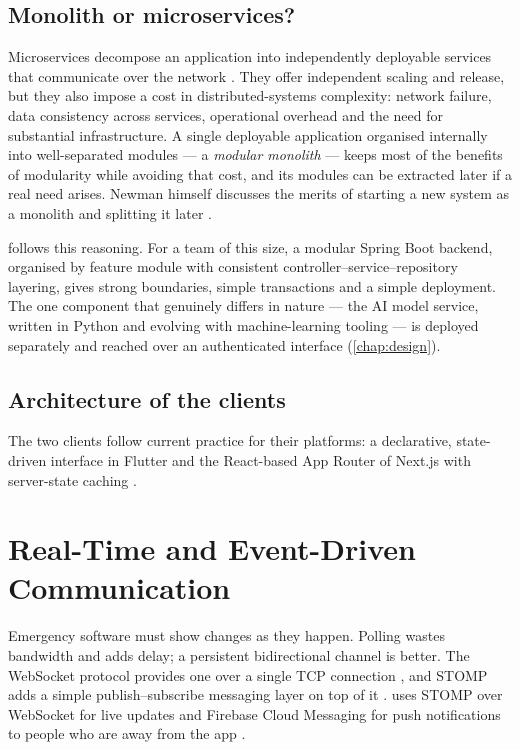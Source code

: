 \subsection{Monolith or microservices?}
Microservices decompose an application into independently deployable services that communicate over the network
\cite{lewis2014microservices,newman2021microservices,richardson2018microservices}. They offer independent
scaling and release, but they also impose a cost in distributed-systems complexity: network failure, data
consistency across services, operational overhead and the need for substantial infrastructure. A single
deployable application organised internally into well-separated modules --- a \emph{modular monolith} --- keeps
most of the benefits of modularity while avoiding that cost, and its modules can be extracted later if a real
need arises. Newman himself discusses the merits of starting a new system as a monolith and splitting it later
\cite{newman2021microservices}.

\ProjectName{} follows this reasoning. For a team of this size, a modular Spring Boot backend, organised by feature
module with consistent controller--service--repository layering, gives strong boundaries, simple transactions and a
simple deployment. The one component that genuinely differs in nature --- the AI model service, written in Python and
evolving with machine-learning tooling --- is deployed separately and reached over an authenticated interface
(\cref{chap:design}).

\subsection{Architecture of the clients}
The two clients follow current practice for their platforms: a declarative, state-driven interface in Flutter
\cite{flutter,riverpod} and the React-based App Router of Next.js with server-state caching \cite{nextjs,tanstackquery}.

\section{Real-Time and Event-Driven Communication}

Emergency software must show changes as they happen. Polling wastes bandwidth and adds delay; a persistent
bidirectional channel is better. The WebSocket protocol provides one over a single TCP connection
\cite{rfc6455}, and STOMP adds a simple publish--subscribe messaging layer on top of it \cite{stomp12}.
\ProjectName{} uses STOMP over WebSocket for live updates and Firebase Cloud Messaging for push notifications to
people who are away from the app \cite{firebase}.

